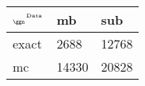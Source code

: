 \begin{tabular}{lll}
    \toprule
    $_{\text{\tiny{\ggn}}}$$^{\text{\tiny{Data}}}$ & mb & sub \\
    \midrule
    exact & 2688
              & 12768 \\
    mc   & 14330
              & 20828 \\
    \bottomrule
\end{tabular}